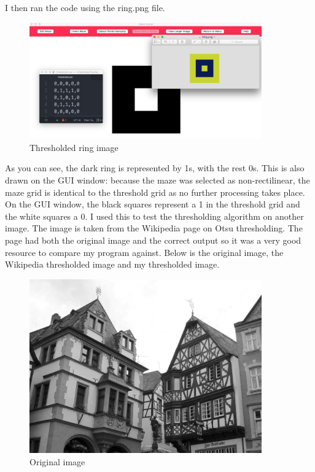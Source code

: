 \documentclass[titlepage]{article}
\begin{document}
I then ran the code using the ring.png file. 

\begin{figure}[H]
  \centering
  \includegraphics[width=10cm]{ringthesh.png}
  \caption{Thresholded ring image}
  \label{fig:dijk}
\end{figure}

As you can see, the dark ring is represented by 1s, with the rest 0s. This is also drawn on the GUI window: because the maze was selected as non-rectilinear, the maze grid is identical to the threshold grid as no further processing takes place. On the GUI window, the black squares represent a 1 in the threshold grid and the white squares a 0. I used this to test the thresholding algorithm on another image. The image is taken from the Wikipedia page on Otsu thresholding. The page had both the original image and the correct output so it was a very good resource to compare my program against. Below is the original image, the Wikipedia thresholded image and my thresholded image.

\begin{figure}[H]
  \centering
  \includegraphics[width=10cm]{orig.jpg}
  \caption{Original image}
  \label{fig:dijk}
\end{figure}
\end{document}
